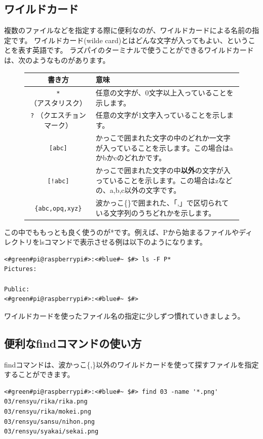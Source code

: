 \documentclass[text03.tex]{subfiles}
\begin{document}
\subsection{ワイルドカード}
複数のファイルなどを指定する際に便利なのが、ワイルドカードによる名前の指定です。
ワイルドカード(wilde card)とはどんな文字が入ってもよい、ということを表す英語です。
ラズパイのターミナルで使うことができるワイルドカードは、次のようなものがあります。
\newpage %
\begin{figure}[h]
    \begin{tabular}{cp{}} \hline
        書き方 & 意味 \\ \hline
        \texttt{*} （アスタリスク）  & 任意の文字が、0文字以上入っていることを示します。\\
        \texttt{?} （クエスチョンマーク） & 任意の文字が1文字入っていることを示します。\\
        \texttt{[abc]} & かっこで囲まれた文字の中のどれか一文字が入っていることを示します。この場合はaかbかcのどれかです。\\
        \texttt{[!abc]} & かっこで囲まれた文字の中{\bf 以外}の文字が入っていることを示します。この場合はzなどの、a,b,c以外の文字です。\\
        \texttt{\{abc,opq,xyz\}} & 波かっこ\{\}で囲まれた、「,」で区切られている文字列のうちどれかを示します。\\ \hline
    \end{tabular}
\end{figure}

この中でももっとも良く使うのが*です。例えば、Pから始まるファイルやディレクトリをlsコマンドで表示させる例は以下のようになります。
\begin{lstlisting}[caption=ワイルドカードの使い方, label=wildcard]
<#green#pi@raspberrypi#>:<#blue#~ $#> ls -F P*
Pictures:

Public:
<#green#pi@raspberrypi#>:<#blue#~ $#>
\end{lstlisting}

ワイルドカードを使ったファイル名の指定に少しずつ慣れていきましょう。

\subsection{便利なfindコマンドの使い方}
findコマンドは、波かっこ\{,\}以外のワイルドカードを使って探すファイルを指定することができます。

\begin{lstlisting}[caption=03ディレクトリからPNGファイルを探す, label=findwild]
<#green#pi@raspberrypi#>:<#blue#~ $#> find 03 -name '*.png'
03/rensyu/rika/rika.png
03/rensyu/rika/mokei.png
03/rensyu/sansu/nihon.png
03/rensyu/syakai/sekai.png
\end{lstlisting}
\end{document}
